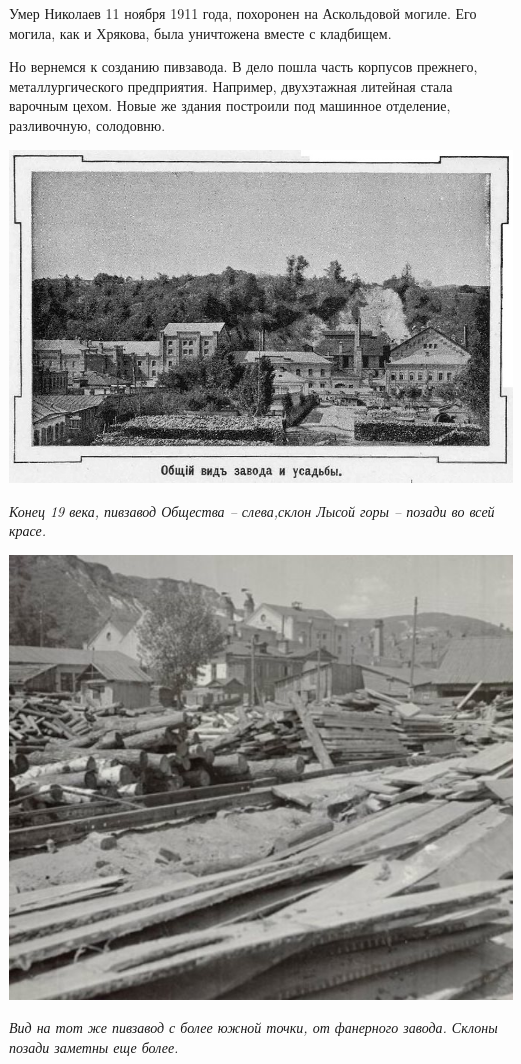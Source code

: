 Умер Николаев 11 ноября 1911 года, похоронен на Аскольдовой могиле. Его могила, как и Хрякова, была уничтожена вместе с кладбищем.

Но вернемся к созданию пивзавода. В дело пошла часть корпусов прежнего, металлургического предприятия. Например, двухэтажная литейная стала варочным цехом. Новые же здания построили под машинное отделение, разливочную, солодовню.

\begin{center}
\includegraphics[width=\linewidth]{chast-kirvys/lys02/pivzavod-tov-02.jpg}

\textit{Конец 19 века, пивзавод Общества – слева,склон Лысой горы – позади во всей красе.}
\end{center}

\begin{center}
\includegraphics[width=0.85\linewidth]{chast-kirvys/lys02/sklony-nad-pivzav.jpg}

\textit{Вид на тот же пивзавод с более южной точки, от фанерного завода. Склоны позади заметны еще более.}
\end{center}


